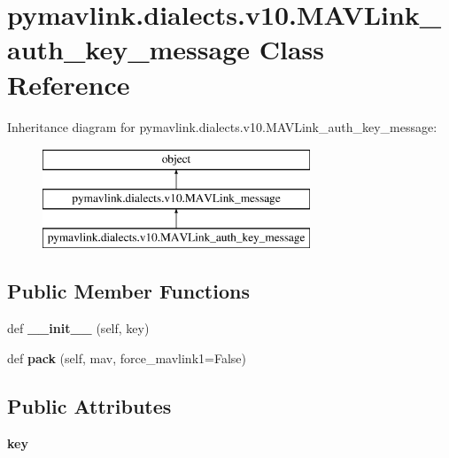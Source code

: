 \hypertarget{classpymavlink_1_1dialects_1_1v10_1_1MAVLink__auth__key__message}{}\section{pymavlink.\+dialects.\+v10.\+M\+A\+V\+Link\+\_\+auth\+\_\+key\+\_\+message Class Reference}
\label{classpymavlink_1_1dialects_1_1v10_1_1MAVLink__auth__key__message}
Inheritance diagram for pymavlink.\+dialects.\+v10.\+M\+A\+V\+Link\+\_\+auth\+\_\+key\+\_\+message\+:\begin{figure}[H]
\begin{center}
\leavevmode
\includegraphics[height=3.000000cm]{classpymavlink_1_1dialects_1_1v10_1_1MAVLink__auth__key__message}
\end{center}
\end{figure}
\subsection*{Public Member Functions}
\begin{DoxyCompactItemize}
\item 
\mbox{\label{classpymavlink_1_1dialects_1_1v10_1_1MAVLink__auth__key__message_a2814922e1cae662b109033159d818f15}} 
def {\bfseries \+\_\+\+\_\+init\+\_\+\+\_\+} (self, key)
\item 
\mbox{\label{classpymavlink_1_1dialects_1_1v10_1_1MAVLink__auth__key__message_a784fee22516ab93e7c80f2d5b8c54e89}} 
def {\bfseries pack} (self, mav, force\+\_\+mavlink1=False)
\end{DoxyCompactItemize}
\subsection*{Public Attributes}
\begin{DoxyCompactItemize}
\item 
\mbox{\label{classpymavlink_1_1dialects_1_1v10_1_1MAVLink__auth__key__message_acef92fa18ee50209942bb0b20ed88015}} 
{\bfseries key}
\end{DoxyCompactItemize}

